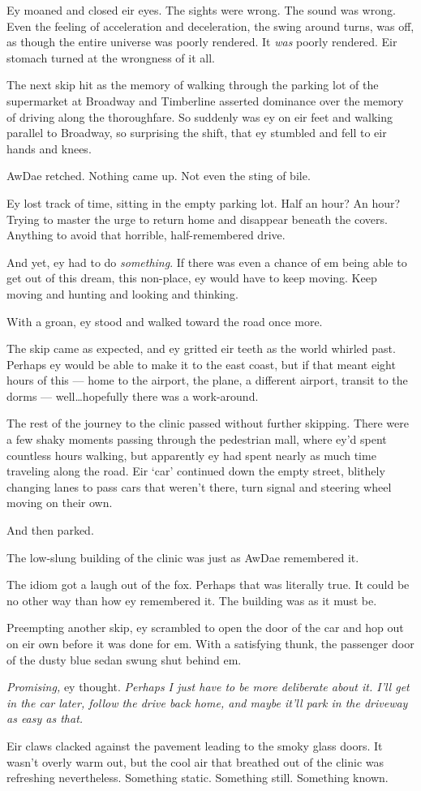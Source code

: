 Ey moaned and closed eir eyes. The sights were wrong. The sound was wrong. Even the feeling of acceleration and deceleration, the swing around turns, was off, as though the entire universe was poorly rendered. It \emph{was} poorly rendered. Eir stomach turned at the wrongness of it all.

The next skip hit as the memory of walking through the parking lot of the supermarket at Broadway and Timberline asserted dominance over the memory of driving along the thoroughfare. So suddenly was ey on eir feet and walking parallel to Broadway, so surprising the shift, that ey stumbled and fell to eir hands and knees.

AwDae retched. Nothing came up. Not even the sting of bile.

Ey lost track of time, sitting in the empty parking lot. Half an hour? An hour? Trying to master the urge to return home and disappear beneath the covers. Anything to avoid that horrible, half-remembered drive.

And yet, ey had to do \emph{something}. If there was even a chance of em being able to get out of this dream, this non-place, ey would have to keep moving. Keep moving and hunting and looking and thinking.

With a groan, ey stood and walked toward the road once more.

The skip came as expected, and ey gritted eir teeth as the world whirled past. Perhaps ey would be able to make it to the east coast, but if that meant eight hours of this — home to the airport, the plane, a different airport, transit to the dorms — well\ldots{}hopefully there was a work-around.

The rest of the journey to the clinic passed without further skipping. There were a few shaky moments passing through the pedestrian mall, where ey'd spent countless hours walking, but apparently ey had spent nearly as much time traveling along the road. Eir `car' continued down the empty street, blithely changing lanes to pass cars that weren't there, turn signal and steering wheel moving on their own.

And then parked.

The low-slung building of the clinic was just as AwDae remembered it.

The idiom got a laugh out of the fox. Perhaps that was literally true. It could be no other way than how ey remembered it. The building was as it must be.

Preempting another skip, ey scrambled to open the door of the car and hop out on eir own before it was done for em. With a satisfying thunk, the passenger door of the dusty blue sedan swung shut behind em.

\emph{Promising,} ey thought. \emph{Perhaps I just have to be more deliberate about it. I'll get in the car later, follow the drive back home, and maybe it'll park in the driveway as easy as that.}

Eir claws clacked against the pavement leading to the smoky glass doors. It wasn't overly warm out, but the cool air that breathed out of the clinic was refreshing nevertheless. Something static. Something still. Something known.
